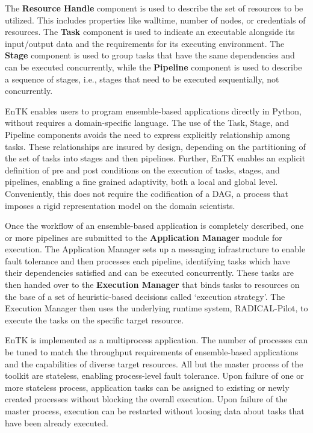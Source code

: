 The \textbf{Resource Handle} component is used to describe the set of
resources to be utilized. This includes properties like walltime, number of
nodes, or credentials of resources. The \textbf{Task} component is used to
indicate an executable alongside its input/output data and the requirements
for its executing environment. The \textbf{Stage} component is used to group
tasks that have the same dependencies and can be executed concurrently, while
the \textbf{Pipeline} component is used to describe a sequence of stages,
i.e., stages that need to be executed sequentially, not concurrently.

EnTK enables users to program ensemble-based applications directly in Python,
without requires a domain-specific language. The use of the Task, Stage, and
Pipeline components avoids the need to express explicitly relationship among
tasks. These relationships are insured by design, depending on the
partitioning of the set of tasks into stages and then pipelines. Further,
EnTK enables an explicit definition of pre and post conditions on the
execution of tasks, stages, and pipelines, enabling a fine grained
adaptivity, both a local and global level. Conveniently, this does not
require the codification of a DAG, a process that imposes a rigid
representation model on the domain scientists.

Once the workflow of an ensemble-based application is completely described,
one or more pipelines are submitted to the \textbf{Application Manager}
module for execution. The Application Manager sets up a messaging
infrastructure to enable fault tolerance and then processes each pipeline,
identifying tasks which have their dependencies satisfied and can be executed
concurrently. These tasks are then handed over to the \textbf{Execution
Manager} that binds tasks to resources on the base of a set of
heuristic-based decisions called `execution strategy'. The Execution Manager
then uses the underlying runtime system, RADICAL-Pilot, to execute the tasks
on the specific target resource.

EnTK is implemented as a multiprocess application. The number of processes
can be tuned to match the throughput requirements of ensemble-based
applications and the capabilities of diverse target resources. All but the
master process of the toolkit are stateless, enabling process-level fault
tolerance. Upon failure of one or more stateless process, application tasks
can be assigned to existing or newly created processes without blocking the
overall execution. Upon failure of the master process, execution can be
restarted without loosing data about tasks that have been already executed.

